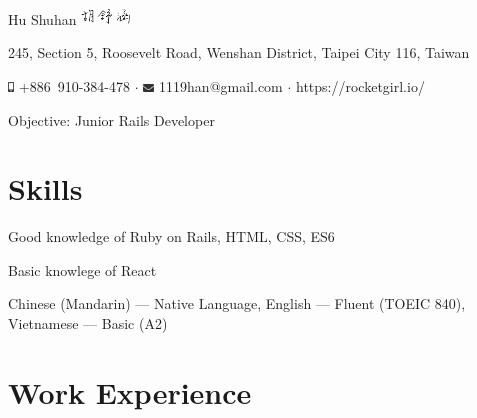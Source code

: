 \documentclass[a4paper,10pt]{article}
\begin{document}
\pagestyle{empty} %
\frenchspacing


\begin{center}
  \Huge{Hu Shuhan \includegraphics[height=1.2em,trim=0 10mm 0 -1cm]{shared/signature.png}}\par

\normalsize 245, Section 5, Roosevelt Road, Wenshan District, Taipei City 116, Taiwan 

  \includegraphics[height=0.7em]{shared/mobile-alt.eps} +886~910-384-478 $\cdot$
  \includegraphics[width=0.8em]{shared/envelope.eps} 1119han@gmail.com $\cdot$ https://rocketgirl.io/

  \vspace*{1em}
{\centering\sffamily \large Objective: Junior Rails Developer}
\end{center}


\section{Skills}
Good knowledge of Ruby on Rails, HTML, CSS, ES6

Basic knowlege of React

{Chinese (Mandarin)} --- Native Language, {English} --- Fluent (TOEIC 840), {Vietnamese} --- Basic (A2)

\section{Work Experience}
\end{document}
